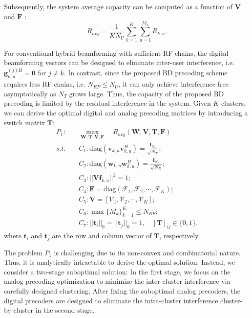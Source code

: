 \documentclass[conference]{IEEEtran}
\begin{document}
{Subsequently, the system average capacity can be computed as a function of ${\bm V}$ and ${\bm F}$ :
\begin{equation}
R_{avg}=\frac{1}{KN_U}\sum_{k=1}^{K}\sum_{u=1}^{M_k}R_{k,u}.
\end{equation}

For conventional hybrid beamforming with sufficient RF chains, the digital beamforming vectors can be designed to eliminate inter-user interference, i.e. ${\bm{g}}^{(j)H}_{k,u}={\bm 0}$ for $j\neq k$. In contrast, since the proposed BD precoding scheme requires less RF chains, i.e. $N_{RF}\leq N_U$, it can only achieve interference-free asymptotically as $N_T$ grows large. Thus, the capacity of the proposed BD precoding is limited by the residual interference in the system. Given $K$ clusters, we can derive the optimal digital and analog precoding matrices by introducing a switch matrix ${\bm T}$:
\begin{align}\label{eq:maxsumrate}
P_1: \quad&\max_{\bm W, \bm T, \bm{V},\bm F}\quad R_{avg}(\bm{W},\bm{V},{\bm T},\bm{F})\\ \nonumber
s.t. \quad&C_1: \text{diag}(\bm{v}_{k,u}\bm{v}_{k,u}^H)=\frac{\bm{I}_{N_T}}{\sqrt{N_T}};\\
&C_2: \text{diag}(\bm{w}_{k,u}\bm{w}_{k,u}^H)=\frac{\bm{I}_{N_{R}}}{\sqrt{N_R}};\nonumber\\
&C_3: ||\bm{V f}_{k,u}||^2=1;\nonumber\\
&C_4: \bm{F} = \text{diag}(\bm{\mathcal{F}}_1, \bm{\mathcal{F}}_2, \cdots, \bm{\mathcal{F}}_{K});\nonumber\\
&C_5: \bm{V} = [\bm{\mathcal{V}}_1, \bm{\mathcal{V}}_2, \cdots, \bm{\mathcal{V}}_K];\nonumber\\
&C_6: \max \{M_k\}_{k=1}^K \leq N_{RF};\nonumber\\
&C_7: ||\bm{t}_{i}||_0=||\bm{t}_{j}||_0=1, \quad [\bm{T}]_{ij}\in\{0,1\}.\nonumber
\end{align}
where $\bm{t}_{i}$ and $\bm{t}_{j}$ are the row and column vector of $\bm{T}$, respectively.

The problem $P_1$ is challenging due to its non-convex and combinatorial nature. Thus, it is analytically intractable to derive the optimal solution. Instead, we consider a two-stage suboptimal solution: In the first stage, we focus on the analog precoding optimization to minimize the inter-cluster interference via carefully designed clustering; After fixing the suboptimal analog precoders, the digital precoders are designed to eliminate the intra-cluster interference cluster-by-cluster in the second stage.

}
\end{document}
